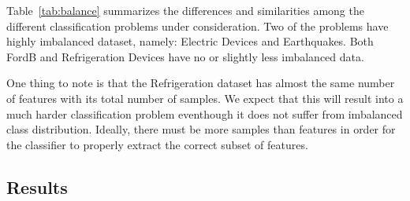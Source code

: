 \documentclass{juliacon}
\begin{document}
\vskip 6pt

\begin{table}
\label{tab:balance}
\end{table}

Table~\ref{tab:balance} summarizes the differences and similarities among the different classification problems under consideration. Two of the problems have highly imbalanced dataset, namely: Electric Devices and Earthquakes. Both FordB and Refrigeration Devices have no or slightly less imbalanced data. 

\vskip 6pt

One thing to note is that the Refrigeration dataset has almost the same number of features with its total number of samples. We expect that this will result into a much harder classification problem eventhough it does not suffer from imbalanced class distribution. Ideally, there must be more samples than features in order for the classifier to properly extract the correct subset of features.


\subsection{Results}

\begin{table}
\label{tab:elec}
\end{table}
\end{document}
